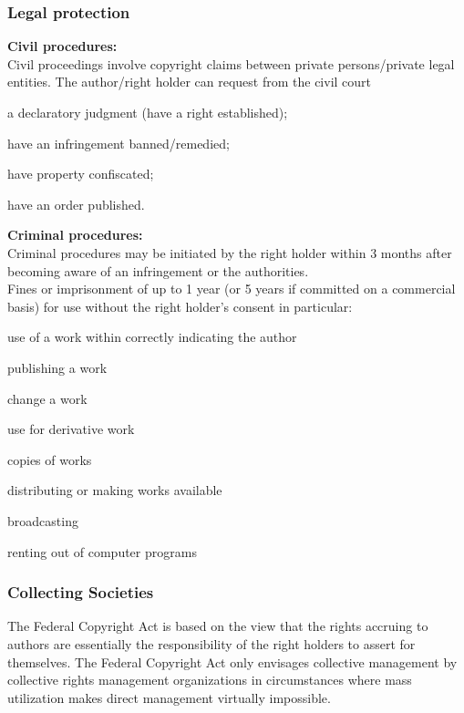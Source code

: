 \subsubsection{Legal protection}
\textbf{Civil procedures:} \\
Civil proceedings involve copyright claims between private persons/private legal entities.
The author/right holder can request from the civil court
\begin{compactitem}
	\item a declaratory judgment (have a right established);
	\item have an infringement banned/remedied;
	\item have property confiscated;
	\item have an order published.
\end{compactitem}
\textbf{Criminal procedures:} \\
Criminal procedures may be initiated by the right holder within 3 months after becoming aware of an infringement or the authorities. \\
Fines or imprisonment of up to 1 year (or 5 years if committed on a commercial basis) for use without the right holder’s consent in particular:
\begin{compactitem}
	\item use of a work within correctly indicating the author
	\item publishing a work
	\item change a work
	\item use for derivative work
	\item copies of works
	\item distributing or making works available
	\item broadcasting
	\item renting out of computer programs
\end{compactitem}

\subsubsection{Collecting Societies}
The Federal Copyright Act is based on the view that the rights accruing to authors are essentially the responsibility of the right holders to assert for themselves. The Federal Copyright Act only envisages collective management by collective rights management organizations in circumstances where mass utilization makes direct management virtually impossible.

